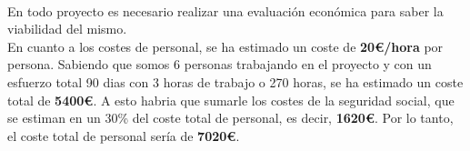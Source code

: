 \documentclass{report}
\begin{document}
        \paragraph*{}
        {
            En todo proyecto es necesario realizar una evaluación económica para saber la viabilidad del mismo.\\

            En cuanto a los costes de personal, se ha estimado un coste de \textbf{20€/hora} por persona.
            Sabiendo que somos 6 personas trabajando en el proyecto y con un esfuerzo total 90 dias con 3 horas de trabajo o 270 horas, se ha estimado un coste total de \textbf{5400€}.
            A esto habria que sumarle los costes de la seguridad social, que se estiman en un 30\% del coste total de personal, es decir, \textbf{1620€}.
            Por lo tanto, el coste total de personal sería de \textbf{7020€}.\\

}
\end{document}
